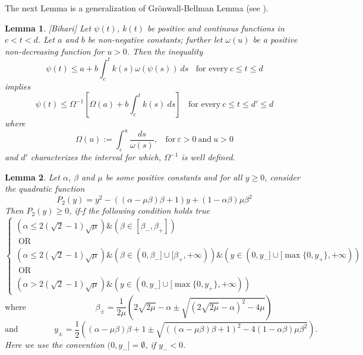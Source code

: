 \documentclass[reqno]{amsart}
\theoremstyle{plain}
\newtheorem{lemma}{Lemma}	%
\theoremstyle{definition}
\theoremstyle{remark}
\begin{document}
The next Lemma is a generalization of Gr\"onwall-Bellman Lemma
(see \cite{bihari1956generalization}).
\begin{lemma}\label{lemmaBihari}[Bihari]
	Let $\psi(t)$, $k(t)$ be positive and continous functions in $c < t < d$. Let $a$ and $b$ be non-negative constants; further let $\omega(u)$ be a positive non-decreasing function for $u > 0$. Then the inequality
	\begin{equation}\label{Biharihyp}
	\psi(t) \leq a+b\int_{c}^{t} k(s)\omega(\psi(s)) \ ds \ \ \ \ \text{for every} \ c\leq t \leq d
	\end{equation}
	implies
	\begin{equation}\label{bihariconclusion}
	\psi(t) \leq \Omega^{-1}\left[\Omega(a)+b\int_{c}^{t} k(s) \ ds\right] \ \ \ \ \text{for every} \ c\leq t \leq d'\leq d
	\end{equation}
	where
	$$\Omega(u):=\int_{\varepsilon}^{u} \frac{ds}{\omega(s)},  \ \ \ \ \text{for} \ \varepsilon > 0 \ \text{and} \ u>0$$
	and $d'$ characterizes the interval for which, $\Omega^{-1}$ is well defined.
\end{lemma}




\begin{lemma}\label{lemma binomial}
Let $\alpha$, $\beta$ and $\mu$ be some positive constants and  for all $y\geq 0$, consider the quadratic function 
\begin{equation}\label{P2y quadratic def}
	P_{2}(y)=y^{2} - \left((\alpha-\mu\beta)\beta+1\right)y + (1-\alpha\beta)\mu\beta^{2}
\end{equation}
 Then $P_{2}(y) \geq 0$, if-f the following condition holds true
\begin{equation}
\begin{cases}
\left(\alpha \leq 2(\sqrt{2}-1)\sqrt{\mu}\right)\&\left(\beta\in [\beta_{-},\beta_{+}]\right) \\
\text{ OR } \\
\left(\alpha \leq 2(\sqrt{2}-1)\sqrt{\mu}\right)\&\left(\beta\in (0,\beta_{-}]\cup[\beta_{+},+\infty)\right)\&\left(y\in (0,y_{-}]\cup[\max\{0,y_{+}\},+\infty)\right) \\
\text{ OR } \\
\left(\alpha > 2(\sqrt{2}-1)\sqrt{\mu}\right)\&\left(y\in (0,y_{-}]\cup[\max\{0,y_{+}\},+\infty)\right)
\end{cases}
\end{equation}
\begin{equation}
\text{where } \qquad \qquad \qquad \qquad \beta_{\pm}=\frac{1}{2\mu}\left(2\sqrt{2\mu}-\alpha \pm \sqrt{\left(2\sqrt{2\mu}-\alpha\right)^{2} - 4\mu}\right) \qquad \qquad \qquad 
\end{equation}
\begin{equation}
\text{and } \qquad \qquad	y_{\pm}=\frac{1}{2}\left((\alpha-\mu\beta)\beta+1 \pm \sqrt{\left((\alpha-\mu\beta)\beta+1\right)^{2}-4(1-\alpha\beta)\mu\beta^{2}}\right). \qquad
\end{equation}
Here we use the convention $(0,y_{-}]=\emptyset$, if $y_{-}<0$.
\end{lemma}
\end{document}
